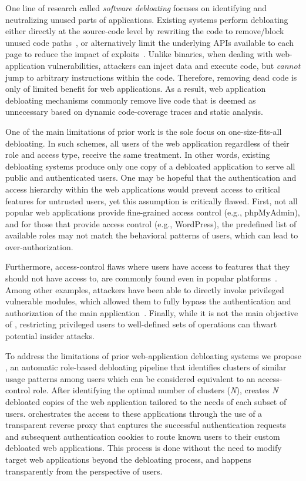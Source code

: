 One line of research called \emph{software debloating} focuses on identifying and neutralizing unused parts of applications. 
Existing systems perform debloating either directly at the source-code level by rewriting the code to remove/block unused code paths~\cite{lessismore, mininode}, or alternatively 
limit the underlying APIs available to each page to reduce the impact of exploits~\cite{saphire}. 
Unlike binaries, when dealing with web-application vulnerabilities, attackers can inject data and execute code, but \emph{cannot} jump to arbitrary instructions within the code. 
Therefore, removing dead code is only of limited benefit for web applications. 
As a result, web application debloating mechanisms commonly remove live code that is deemed as unnecessary based on dynamic code-coverage traces and static analysis. 

One of the main limitations of prior work is the sole focus on one-size-fits-all debloating. 
In such schemes, all users of the web application regardless of their role and access type, receive the same treatment. 
In other words, existing debloating systems produce only one copy of a debloated application to serve all public and authenticated users. 
One may be hopeful that the authentication and access hierarchy within the web applications would prevent access to critical features for untrusted users, yet
this assumption is critically flawed. 
First, not all popular web applications provide fine-grained access control (e.g., phpMyAdmin), and for those that provide access control (e.g., WordPress), the predefined list of available roles may not match the behavioral patterns of users, which can lead to over-authorization. 

Furthermore, access-control flaws where users have access to features that they should not have access to, are commonly found even in popular platforms~\cite{dalton2009nemesis,doupe2011fear}. 
Among other examples, attackers have been able to directly invoke privileged vulnerable modules, which allowed them to fully bypass the authentication and authorization of the main application~\cite{wpfilemanager}. 
Finally, while it is not the main objective of \dbltr{}, restricting privileged users to well-defined sets of operations can thwart potential insider attacks.

To address the limitations of prior web-application debloating systems
we propose \dbltr{}, an automatic role-based debloating pipeline that identifies clusters of similar usage patterns among users which can be considered equivalent to an access-control role. 
After identifying the optimal number of clusters (\emph{N}), \dbltr{} creates \emph{N} debloated copies of the web application tailored to the needs of each subset of users. \dbltr{} orchestrates the access to these applications through the use of a transparent reverse proxy that captures the successful authentication requests and subsequent authentication cookies to route known users to their custom debloated web applications. 
This process is done without the need to modify target web applications beyond the debloating process, and happens transparently from the perspective of users.

